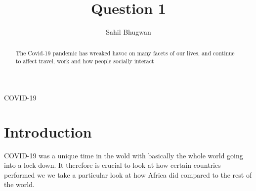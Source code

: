 \documentclass[12pt,preprint, authoryear]{elsarticle}
\numberwithin{equation}{section}
\numberwithin{figure}{section}
\numberwithin{table}{section}
\begin{document}
\begin{frontmatter}  %

\title{Question 1}





\author[Add1]{Sahil Bhugwan}





\address[Add1]{Github-\url{https://github.com/SBhugwan}}


\begin{abstract}
\small{
The Covid-19 pandemic has wreaked havoc on many facets of our lives, and
continue to affect travel, work and how people socially interact
}
\end{abstract}

\vspace{1cm}


\begin{keyword}
\footnotesize{
COVID-19 \\
\vspace{0.3cm}
}
\end{keyword}



\vspace{0.5cm}

\end{frontmatter}



\pagestyle{fancy}
\chead{}
\rhead{}
\lfoot{}
\lhead{}
\cfoot{}


\headsep 35pt %




\hypertarget{introduction}{%
\section{\texorpdfstring{Introduction
\label{Introduction}}{Introduction }}\label{introduction}}

COVID-19 was a unique time in the wold with basically the whole world
going into a lock down. It therefore is crucial to look at how certain
countries performed we we take a particular look at how Africa did
compared to the rest of the world.
\end{document}
